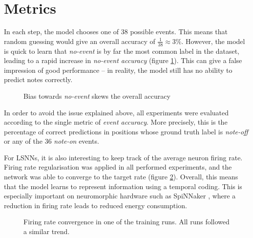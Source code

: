 \documentclass[../../report.tex]{subfiles}
\begin{document}
\section{Metrics}

In each step, the model chooses one of 38 possible events. This means that
random guessing would give an overall accuracy of \(\frac{1}{38} \approx 3\%\).
However, the model is quick to learn that \emph{no-event} is by far the most
common label in the dataset, leading to a rapid increase in \emph{no-event
accuracy} (figure \ref{fig:initial-accuracy}). This can give a false impression
of good performance -- in reality, the model still has no ability to predict
notes correctly.

\begin{figure}
  \centering
  \caption{Bias towards \emph{no-event} skews the overall accuracy}
  \label{fig:initial-accuracy}
\end{figure}

In order to avoid the issue explained above, all experiments were evaluated
according to the single metric of \emph{event accuracy}. More precisely, this is
the percentage of correct predictions in positions whose ground truth label is
\emph{note-off} or any of the 36 \emph{note-on} events.

For LSNNs, it is also interesting to keep track of the average neuron firing
rate. Firing rate regularisation was applied in all performed experiments, and
the network was able to converge to the target rate (figure
\ref{fig:firing-rate}). Overall, this means that the model learns to represent
information using a temporal coding. This is especially important on
neuromorphic hardware such as SpiNNaker \cite{Furber2014}, where a reduction in
firing rate leads to reduced energy consumption.

\begin{figure}
  \centering
  \caption{Firing rate convergence in one of the training runs. All runs
  followed a similar trend.}
  \label{fig:firing-rate}
\end{figure}
\end{document}
